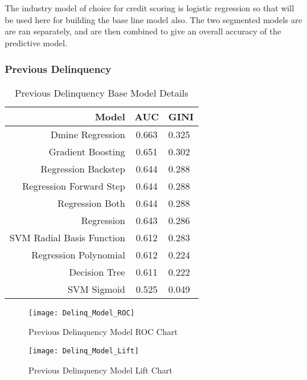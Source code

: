 The industry model of choice for credit scoring is logistic regression so that will be used here for building the base line model also. The two segmented models are are ran separately, and are then combined to give an overall accuracy of the predictive model. 


\subsubsection{Previous Delinquency}

\begin{table}[H]
	\centering
	\begin{tabular}{r | c | l}
		\hline
		\textbf{Model} & \textbf{AUC} & \textbf{GINI} \\
		\hline
		Dmine Regression          & 0.663        & 0.325 \\
		Gradient Boosting          & 0.651        & 0.302 \\
		Regression Backstep          & 0.644        & 0.288 \\
		Regression Forward Step          & 0.644        & 0.288 \\
		Regression Both          & 0.644        & 0.288 \\
		Regression          & 0.643        & 0.286 \\
		SVM Radial Basis Function          & 0.612        & 0.283 \\
		Regression Polynomial          & 0.612        & 0.224 \\
		Decision Tree          & 0.611        & 0.222 \\
		SVM Sigmoid          & 0.525        & 0.049 \\
		\hline
	\end{tabular}
	\caption{Previous Delinquency Base Model Details}
\end{table}


\begin{figure}[H]
	\texttt{[image: Delinq\_Model\_ROC]}
	\caption{Previous Delinquency Model ROC Chart}
	\label{fig:Delinq_Model_ROC}
\end{figure}

\begin{figure}[H]
	\texttt{[image: Delinq\_Model\_Lift]}
	\caption{Previous Delinquency Model Lift Chart}
	\label{fig:Delinq_Model_Lift}
\end{figure}

